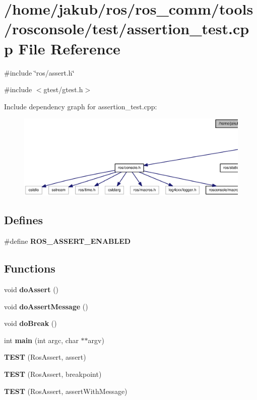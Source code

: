 \section{/home/jakub/ros/ros\_\-comm/tools/rosconsole/test/assertion\_\-test.cpp File Reference}
\label{assertion__test_8cpp}
{\ttfamily \#include \char`\"{}ros/assert.h\char`\"{}}\par
{\ttfamily \#include $<$gtest/gtest.h$>$}\par
Include dependency graph for assertion\_\-test.cpp:
\nopagebreak
\begin{figure}[H]
\begin{center}
\leavevmode
\includegraphics[width=400pt]{assertion__test_8cpp__incl}
\end{center}
\end{figure}
\subsection*{Defines}
\begin{DoxyCompactItemize}
\item 
\#define {\bf ROS\_\-ASSERT\_\-ENABLED}
\end{DoxyCompactItemize}
\subsection*{Functions}
\begin{DoxyCompactItemize}
\item 
void {\bf doAssert} ()
\item 
void {\bf doAssertMessage} ()
\item 
void {\bf doBreak} ()
\item 
int {\bf main} (int argc, char $\ast$$\ast$argv)
\item 
{\bf TEST} (RosAssert, assert)
\item 
{\bf TEST} (RosAssert, breakpoint)
\item 
{\bf TEST} (RosAssert, assertWithMessage)
\end{DoxyCompactItemize}


